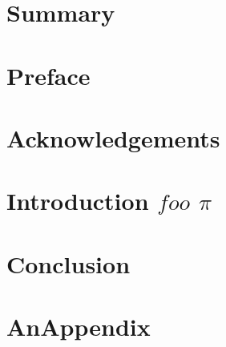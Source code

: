 \prefrontmatter
\maketitle
\makecolophon

\frontmatter
\chapter{Summary}
\lipsum[1]
\cite{adams1980hitchhiker}
\chapter{Preface}
\chapter{Acknowledgements}
\clearforchapter
\tableofcontents
\mylistoftodos

\mainmatter
\chapter{Introduction $foo$ $\pi$}
\lipsum[2]
\chapter{Conclusion}
\lipsum[3]
\blinddocument 

\appendix
\chapter{AnAppendix}
\lipsum[4]


